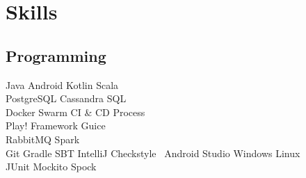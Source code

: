 \documentclass[]{deedy-resume-openfont}
\begin{document}
\begin{minipage}[t]{0.33\textwidth}
%


\section{Skills}
\subsection{Programming}
Java \textbullet{}   
Android \textbullet{} 
Kotlin \textbullet{} 
Scala \\
PostgreSQL \textbullet{}   
Cassandra \textbullet{} 
SQL \\
Docker \textbullet{} 
Swarm \textbullet{} 
CI \& CD Process\\
Play! Framework \textbullet{} 
Guice \\
RabbitMQ \textbullet{} 
Spark \\
Git \textbullet{} 
Gradle \textbullet{} 
SBT \textbullet{}
IntelliJ \textbullet{}
Checkstyle \
Android Studio \textbullet{} 
Windows \textbullet{} 
Linux \\
JUnit \textbullet{} 
Mockito \textbullet{} 
Spock \\
\sectionsep

\end{minipage}
\end{document}
